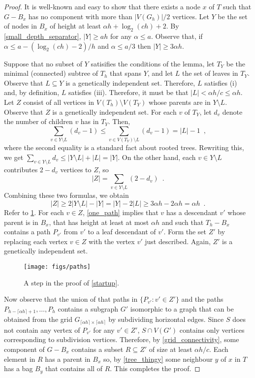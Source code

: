 \documentclass{patmorin}
\begin{document}
\begin{proof}
  It is well-known and easy to show that there exists a node $x$ of $T$ such that $G-B_x$ has no component with more than $|V(G_h)|/2$ vertices.  Let $Y$ be the set of nodes in $B_x$ of height at least $\alpha h+\log_2(ch)+2$. By \cref{small_depth_separator}, $|Y|\ge ah$ for any $\alpha\le a$.  Observe that, if $\alpha \le a-(\log_2(ch)-2)/h$ and $\alpha \le a/3$ then $|Y|\ge 3\alpha h$.

  Suppose that no subset of $Y$ satisifies the conditions of the lemma, let $T_Y$ be the minimal (connected) subtree of $T_h$ that spans $Y$, and let $L$ the set of leaves in $T_Y$.  Observe that $L\subseteq Y$ is a genetically independent set. Therefore, $L$ satisfies (i) and, by definition, $L$ satisfies (iii).  Therefore, it must be that $|L|<\alpha h/c\le\alpha h$.  Let $Z$ consist of all vertices in $V(T_h)\setminus V(T_Y)$ whose parents are in $Y\setminus L$.   Observe that $Z$ is a genetically independent set. For each $v$ of $T_Y$, let $d_v$ denote the number of children $v$ has in $T_Y$.  Then,
  \[
     \sum_{v\in Y\setminus L} (d_v-1) 
     \le \sum_{v\in V(T_Y)\setminus L} (d_v-1)
     = |L|-1 \enspace ,
  \]
  where the second equality is a standard fact about rooted trees.
  Rewriting this, we get $\sum_{v\in Y\setminus L} {d_v} \le |Y\setminus L| + |L| = |Y|$.  On the other hand, each $v\in Y\setminus L$ contributes $2-d_v$ vertices to $Z$, so
  \[
    |Z| = \sum_{v\in Y\setminus L} (2-d_v) \enspace .
  \]
  Combining these two formulas, we obtain
  \[
    |Z| \ge 2|Y\setminus L| - |Y| = |Y| - 2|L| \ge 
     3\alpha h - 2\alpha h = \alpha h \enspace .
  \]
  Refer to \cref{paths}.  For each $v\in Z$, \cref{one_path} implies that $v$ has a descendant $v'$ whose parent is in $B_x$, that has height at least at most $\alpha h$ and such that $T_h-B_x$ contains a path $P_{v'}$ from $v'$ to a leaf descendant of $v'$.  Form the set $Z'$ by replacing each vertex $v\in Z$ with the vertex $v'$ just described.  Again, $Z'$ is a genetically independent set.

  \begin{figure}
    \begin{center}
      \texttt{[image: figs/paths]}
    \end{center}
    \caption{A step in the proof of \cref{startup}.}
    \label{paths}
  \end{figure}

  Now observe that the union of that paths in  $\{P_{v'}:v'\in Z'\}$ and the paths $P_{h-\lceil\alpha h\rceil+1},\ldots,P_{h}$ contains a subgraph $G'$ isomorphic to a graph that can be obtained from the grid $G_{\lceil\alpha h\rceil\times\lceil\alpha h\rceil}$ by subdividing horizontal edges.  Since $S$ does not contain any vertex of $P_{v'}$ for any $v'\in Z'$,  $S\cap V(G')$ contains only vertices corresponding to subdivision vertices.  Therefore, by \cref{grid_connectivity}, some component of $G-B_x$ contains a subset $R\subseteq Z'$ of size at least $\alpha h/c$.  Each element in $R$ has a parent in $B_x$ so, by \cref{tree_thingy} some neighbour $y$ of $x$ in $T$ has a bag $B_y$ that contains all of $R$.  This completes the proof.
\end{proof}
\end{document}
